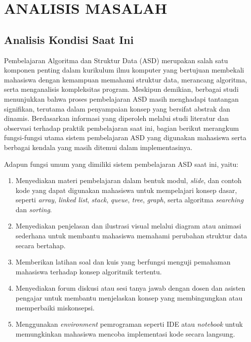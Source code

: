 \chapter{ANALISIS MASALAH}
\label{chap:analisis-masalah}

\section{Analisis Kondisi Saat Ini}

Pembelajaran Algoritma dan Struktur Data (ASD) merupakan salah satu komponen penting dalam kurikulum ilmu komputer yang bertujuan membekali mahasiswa dengan kemampuan memahami struktur data, merancang algoritma, serta menganalisis kompleksitas program. Meskipun demikian, berbagai studi menunjukkan bahwa proses pembelajaran ASD masih menghadapi tantangan signifikan, terutama dalam penyampaian konsep yang bersifat abstrak dan dinamis. Berdasarkan informasi yang diperoleh melalui studi literatur dan observasi terhadap praktik pembelajaran saat ini, bagian berikut merangkum fungsi-fungsi utama sistem pembelajaran ASD yang digunakan mahasiswa serta berbagai kendala yang masih ditemui dalam implementasinya.

Adapun fungsi umum yang dimiliki sistem pembelajaran ASD saat ini, yaitu:

\begin{enumerate}
    \item Menyediakan materi pembelajaran dalam bentuk modul, \textit{slide}, dan contoh kode yang dapat digunakan mahasiswa untuk mempelajari konsep dasar, seperti \textit{array}, \textit{linked list}, \textit{stack}, \textit{queue}, \textit{tree}, \textit{graph}, serta algoritma \textit{searching} dan \textit{sorting}.
    \item Menyediakan penjelasan dan ilustrasi visual melalui diagram atau animasi sederhana untuk membantu mahasiswa memahami perubahan struktur data secara bertahap.
    \item Memberikan latihan soal dan kuis yang berfungsi menguji pemahaman mahasiswa terhadap konsep algoritmik tertentu.
    \item Menyediakan forum diskusi atau sesi tanya jawab dengan dosen dan asisten pengajar untuk membantu menjelaskan konsep yang membingungkan atau memperbaiki miskonsepsi.
    \item Menggunakan \textit{environment} pemrograman seperti IDE atau \textit{notebook} untuk memungkinkan mahasiswa mencoba implementasi kode secara langsung.
\end{enumerate}

